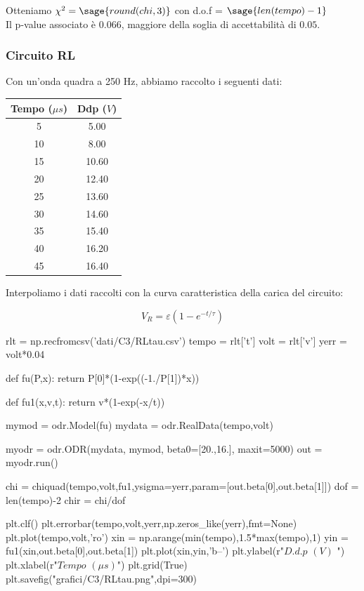 Otteniamo $\chi^2 = \sage{round(chi,3)}$ con d.o.f = $\sage{len(tempo)-1}$\\
Il p-value associato è $0.066$, maggiore della soglia di accettabilità di $0.05$.

\subsubsection{Circuito RL}
Con un'onda quadra a 250 Hz, abbiamo raccolto i seguenti dati:

\begin{center}
\begin{tabular}{*{2}{c}}
Tempo ($\mu s$) & Ddp ($V$) \\
\midrule
5 & 5.00 \\
10 & 8.00 \\
15 & 10.60 \\
20 & 12.40 \\
25 & 13.60 \\
30 & 14.60 \\
35 & 15.40 \\
40 & 16.20 \\
45 & 16.40 \\
\end{tabular}
\end{center}
Interpoliamo i dati raccolti con la curva caratteristica della carica del circuito:

$$V_R = \varepsilon \left( 1-e^{-t/\tau} \right)$$

\begin{sagesilent}
 
rlt = np.recfromcsv('dati/C3/RLtau.csv')
tempo = rlt['t']
volt = rlt['v']
yerr = volt*0.04

def fu(P,x):
    return P[0]*(1-exp((-1./P[1])*x))
    
def fu1(x,v,t):
    return v*(1-exp(-x/t))
    
mymod = odr.Model(fu)
mydata = odr.RealData(tempo,volt)

myodr = odr.ODR(mydata, mymod, beta0=[20.,16.], maxit=5000)
out = myodr.run()

chi = chiquad(tempo,volt,fu1,ysigma=yerr,param=[out.beta[0],out.beta[1]])
dof = len(tempo)-2
chir = chi/dof

plt.clf()
plt.errorbar(tempo,volt,yerr,np.zeros_like(yerr),fmt=None)
plt.plot(tempo,volt,'ro')
xin = np.arange(min(tempo),1.5*max(tempo),1)
yin = fu1(xin,out.beta[0],out.beta[1])
plt.plot(xin,yin,'b--')
plt.ylabel(r"$D.d.p$ $(V)$ ")
plt.xlabel(r"$Tempo$ $(\mu s)$")
plt.grid(True)
plt.savefig("grafici/C3/RLtau.png",dpi=300)

\end{sagesilent}




